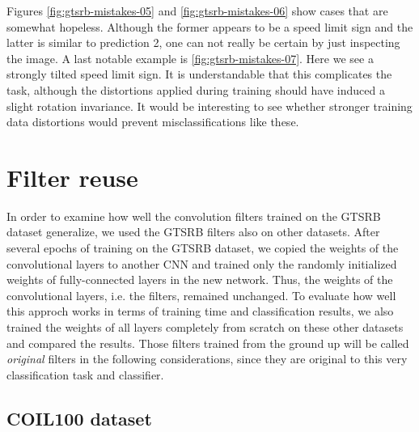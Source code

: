 \documentclass[11pt, a4paper]{article}
\begin{document}
Figures \ref{fig:gtsrb-mistakes-05} and \ref{fig:gtsrb-mistakes-06} show cases that are somewhat hopeless. Although the former appears to be a speed limit sign and the latter is similar to prediction 2, one can not really be certain by just inspecting the image. A last notable example is \ref{fig:gtsrb-mistakes-07}. Here we see a strongly tilted speed limit sign. It is understandable that this complicates the task, although the distortions applied during training should have induced a slight rotation invariance. It would be interesting to see whether stronger training data distortions would prevent misclassifications like these.

\section{Filter reuse}

In order to examine how well the convolution filters trained on the GTSRB dataset generalize, we used the GTSRB filters also on other datasets. After several epochs of training on the GTSRB dataset, we copied the weights of the convolutional layers to another CNN and trained only the randomly initialized weights of fully-connected layers in the new network. Thus, the weights of the convolutional layers, i.e. the filters, remained unchanged. To evaluate how well this approch works in terms of training time and classification results, we also trained the weights of all layers completely from scratch on these other datasets and compared the results. Those filters trained from the ground up will be called \textit{original} filters in the following considerations, since they are original to this very classification task and classifier.

\subsection{COIL100 dataset}
\end{document}
